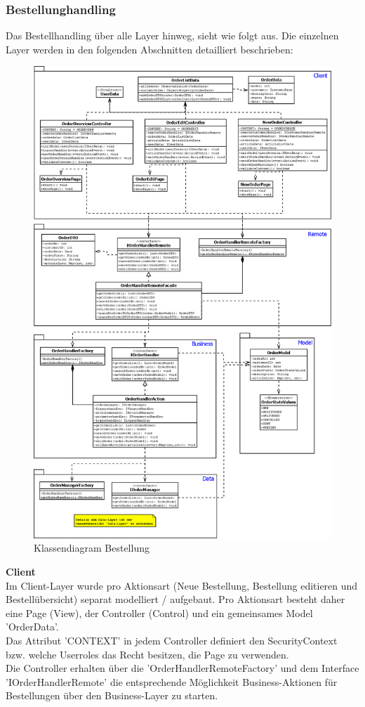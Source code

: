 \subsubsection{Bestellunghandling}
Das Bestellhandling über alle Layer hinweg, sieht wie folgt aus. Die einzelnen Layer werden in den folgenden Abschnitten detailliert beschrieben:
\begin{figure}[H]
	\centering
	\includegraphics[width=0.7\linewidth]{Images/Class-Order}
	\caption{Klassendiagram Bestellung}
	\label{fig:class-order}
\end{figure}
\clearpage
\textbf{Client}\\
Im Client-Layer wurde pro Aktionsart (Neue Bestellung, Bestellung editieren und Bestellübersicht) separat modelliert / aufgebaut. Pro Aktionsart besteht daher eine Page (View), der Controller (Control) und ein gemeinsames Model 'OrderData'.\\
Das Attribut 'CONTEXT' in jedem Controller definiert den SecurityContext bzw. welche Userroles das Recht besitzen, die Page zu verwenden.\\
Die Controller erhalten über die 'OrderHandlerRemoteFactory' und dem Interface 'IOrderHandlerRemote' die entsprechende Möglichkeit Business-Aktionen für Bestellungen über den Business-Layer zu starten.
